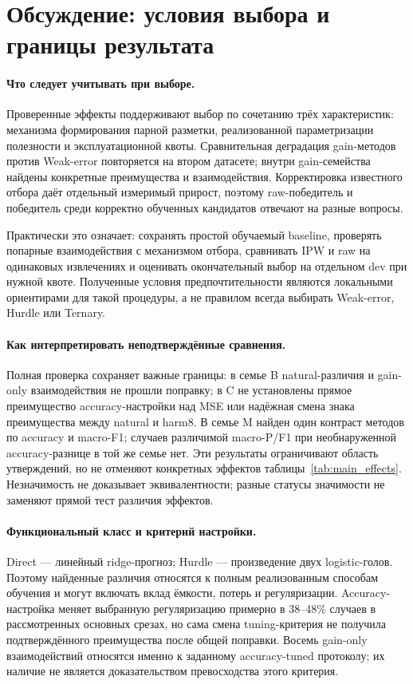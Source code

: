 \section{Обсуждение: условия выбора и границы результата}
\paragraph{Что следует учитывать при выборе.}
Проверенные эффекты поддерживают выбор по сочетанию трёх характеристик:
механизма формирования парной разметки, реализованной параметризации
полезности и эксплуатационной квоты. Сравнительная деградация
gain-методов против Weak-error повторяется на втором датасете;
внутри gain-семейства найдены конкретные преимущества и взаимодействия.
Корректировка известного отбора даёт отдельный измеримый прирост,
поэтому raw-победитель и победитель среди корректно обученных
кандидатов отвечают на разные вопросы.

Практически это означает: сохранять простой обучаемый baseline,
проверять попарные взаимодействия с механизмом отбора, сравнивать
IPW и raw на одинаковых извлечениях и оценивать окончательный
выбор на отдельном dev при нужной квоте. Полученные условия
предпочтительности являются локальными ориентирами для такой процедуры,
а не правилом всегда выбирать Weak-error, Hurdle или Ternary.

\paragraph{Как интерпретировать неподтверждённые сравнения.}
Полная проверка сохраняет важные границы: в семье B natural-различия
и gain-only взаимодействия не прошли поправку; в C не установлены
прямое преимущество accuracy-настройки над MSE или надёжная смена
знака преимущества между natural и harm8. В семье M найден один
контраст методов по accuracy и macro-F1; случаев различимой macro-P/F1
при необнаруженной accuracy-разнице в той же семье нет.
Эти результаты ограничивают область утверждений, но не отменяют
конкретных эффектов таблицы~\ref{tab:main_effects}.
Незначимость не доказывает эквивалентности; разные статусы значимости
не заменяют прямой тест различия эффектов.

\paragraph{Функциональный класс и критерий настройки.}
Direct --- линейный ridge-прогноз; Hurdle --- произведение двух
logistic-голов. Поэтому найденные различия относятся к полным
реализованным способам обучения и могут включать вклад ёмкости,
потерь и регуляризации. Accuracy-настройка меняет выбранную
регуляризацию примерно в 38--48\% случаев в рассмотренных основных
срезах, но сама смена tuning-критерия не получила подтверждённого
преимущества после общей поправки. Восемь gain-only взаимодействий
относятся именно к заданному accuracy-tuned протоколу;
их наличие не является доказательством превосходства этого критерия.

